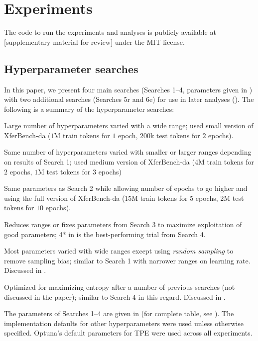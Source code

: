 \section{Experiments}
\unskip\label{hpo:sec:experiments}
The code to run the experiments and analyses is publicly available at [supplementary material for review] under the MIT license.

\subsection{Hyperparameter searches}
In this paper, we present four main searches (Searches 1--4, parameters given in ) with two additional searches (Searches 5r and 6e) for use in later analyses ().
The following is a summary of the hyperparameter searches:
\smallskip
\begin{description}[nosep,leftmargin=0.2in]
  \item[Search 1] Large number of hyperparameters varied with a wide range; used small version of XferBench-da ($1$M train tokens for $1$ epoch, $200$k test tokens for $2$ epochs).
  \item[Search 2] Same number of hyperparameters varied with smaller or larger ranges depending on results of Search 1; used medium version of XferBench-da ($4$M train tokens for $2$ epochs, $1$M test tokens for $3$ epochs)
  \item[Search 3] Same parameters as Search 2 while allowing number of epochs to go higher and using the full version of XferBench-da ($15$M train tokens for $5$ epochs, $2$M test tokens for $10$ epochs).
  \item[Search 4] Reduces ranges or fixes parameters from Search 3 to maximize exploitation of good parameters; 4* in  is the best-performing trial from Search 4.
  \item[Search 5r] Most parameters varied with wide ranges except using \emph{random sampling} to remove sampling bias; similar to Search 1 with narrower ranges on learning rate. Discussed in .
  \item[Search 6e] Optimized for maximizing entropy after a number of previous searches (not discussed in the paper); similar to Search 4 in this regard. Discussed in .
\end{description}
The parameters of Searches 1--4 are given in  (for complete table, see ).
The implementation defaults for other hyperparameters were used unless otherwise specified.
Optuna's default parameters for TPE were used across all experiments.

